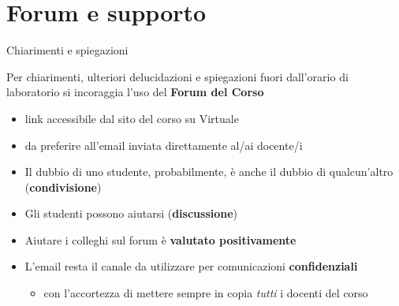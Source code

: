 \documentclass[presentation]{beamer}
\begin{document}
\section{Forum e supporto}

\begin{frame}{Chiarimenti e spiegazioni}

Per chiarimenti, ulteriori delucidazioni e spiegazioni fuori dall'orario di laboratorio
si incoraggia l'uso del \textbf{Forum del Corso}
\begin{itemize}
    \item link accessibile dal sito del corso su Virtuale
    \item da preferire all'email inviata direttamente al/ai docente/i
\end{itemize}

\begin{block}{}
    \begin{itemize}
        \item Il dubbio di uno studente, probabilmente, è anche il dubbio di qualcun'altro (\textbf{condivisione})
        \item Gli studenti possono aiutarsi (\textbf{discussione})
        \item Aiutare i colleghi sul forum è \textbf{valutato positivamente}
    \end{itemize}
\end{block}
\vfill
\begin{itemize}
\item L'email resta il canale da utilizzare per comunicazioni \textbf{confidenziali}
    \begin{itemize}
        \item con l'accortezza di mettere sempre in copia \emph{tutti} i docenti del corso
    \end{itemize}
\end{itemize}



\end{frame}
\end{document}
